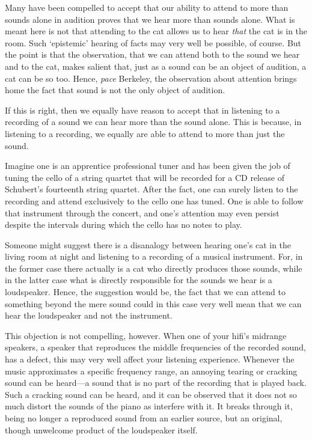 \documentclass[sloppy, journal, git, bytitle, dodraft]{humapap}
\begin{document}
Many have been compelled to accept that our ability to attend to more than sounds alone in audition proves that we hear more than sounds alone. What is meant here is not that attending to the cat allows us to hear \emph{that} the cat is in the room. Such `epistemic' hearing of facts may very well be possible, of course. But the point is that the observation, that we can attend both to the sound we hear and to the cat, makes salient that, just as a sound can be an object of audition, a cat can be so too. Hence, \emph{pace} Berkeley, the observation about attention brings home the fact that sound is not the only object of audition.  

If this is right, then we equally have reason to accept that in listening to a recording of a sound we can hear more than the sound alone. This is because, in listening to a recording, we equally are able to attend to more than just the sound. 

Imagine one is an apprentice professional tuner and has been given the job of tuning the cello of a string quartet that will be recorded for a CD release of Schubert's fourteenth string quartet. After the fact, one can surely listen to the recording and attend exclusively to the cello one has tuned. One is able to follow that instrument through the concert, and one's attention may even persist despite the intervals during which the cello has no notes to play.

Someone might suggest there is a disanalogy between hearing one's cat in the living room at night and listening to a recording of a musical instrument. For, in the former case there actually is a cat who directly produces those sounds, while in the latter case what is directly responsible for the sounds we hear is a loudspeaker. Hence, the suggestion would be, the fact that we can attend to something beyond the mere sound could in this case very well mean that we can hear the loudspeaker and not the instrument. 

This objection is not compelling, however. When one of your hifi's midrange speakers, a speaker that reproduces the middle frequencies of the recorded sound, has a defect, this may very well affect your listening experience. Whenever the music approximates a specific frequency range, an annoying tearing or cracking sound can be heard---a sound that is no part of the recording that is played back. Such a cracking sound can be heard, and it can be observed that it does not so much distort the sounds of the piano as interfere with it. It breaks through it, being no longer a reproduced sound from an earlier source, but an original, though unwelcome product of the loudspeaker itself. 
\end{document}
